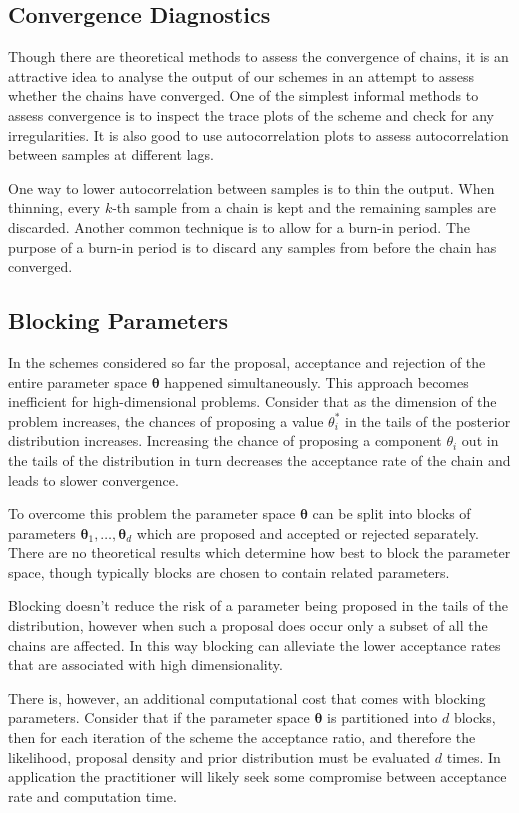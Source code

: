\subsection*{Convergence Diagnostics}
\label{ssec:convergence_diagnostics}
Though there are theoretical methods to assess the convergence of chains, it is an attractive idea to analyse the output of our schemes in an attempt to assess whether the chains have converged. One of the simplest informal methods to assess convergence is to inspect the trace plots of the scheme and check for any irregularities. It is also good to use autocorrelation plots to assess autocorrelation between samples at different lags.

One way to lower autocorrelation between samples is to thin the output. When thinning, every $k$-th sample from a chain is kept and the remaining samples are discarded. Another common technique is to allow for a burn-in period. The purpose of a burn-in period is to discard any samples from before the chain has converged.

\subsection*{Blocking Parameters}
\label{ssec:blocking}
In the schemes considered so far the proposal, acceptance and rejection of the entire parameter space $\bm{\theta}$ happened simultaneously. This approach becomes inefficient for high-dimensional problems. Consider that as the dimension of the problem increases, the chances of proposing a value $\theta_i^*$ in the tails of the posterior distribution increases. Increasing the chance of proposing a component $\theta_i$ out in the tails of the distribution in turn decreases the acceptance rate of the chain and leads to slower convergence.

To overcome this problem the parameter space $\bm{\theta}$ can be split into blocks of parameters $\bm{\theta}_1, \ldots, \bm{\theta}_d$ which are proposed and accepted or rejected separately. There are no theoretical results which determine how best to block the parameter space, though typically blocks are chosen to contain related parameters.

Blocking doesn't reduce the risk of a parameter being proposed in the tails of the distribution, however when such a proposal does occur only a subset of all the chains are affected. In this way blocking can alleviate the lower acceptance rates that are associated with high dimensionality.

There is, however, an additional computational cost that comes with blocking parameters. Consider that if the parameter space $\bm{\theta}$ is partitioned into $d$ blocks, then for each iteration of the scheme the acceptance ratio, and therefore the likelihood, proposal density and prior distribution must be evaluated $d$ times. In application the practitioner will likely seek some compromise between acceptance rate and computation time.